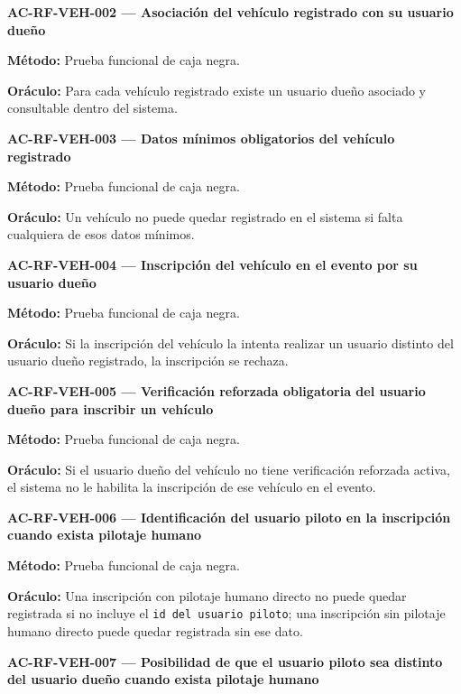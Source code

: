 \documentclass[10pt,letterpaper]{article}
\begin{document}
\noindent\textbf{AC-RF-VEH-002 --- Asociación del vehículo registrado con su usuario dueño}\par
\textbf{Método:} Prueba funcional de caja negra.\par
\textbf{Oráculo:} Para cada vehículo registrado existe un usuario dueño asociado y consultable dentro del sistema.\par\vspace{0.45em}
\noindent\textbf{AC-RF-VEH-003 --- Datos mínimos obligatorios del vehículo registrado}\par
\textbf{Método:} Prueba funcional de caja negra.\par
\textbf{Oráculo:} Un vehículo no puede quedar registrado en el sistema si falta cualquiera de esos datos mínimos.\par\vspace{0.45em}
\noindent\textbf{AC-RF-VEH-004 --- Inscripción del vehículo en el evento por su usuario dueño}\par
\textbf{Método:} Prueba funcional de caja negra.\par
\textbf{Oráculo:} Si la inscripción del vehículo la intenta realizar un usuario distinto del usuario dueño registrado, la inscripción se rechaza.\par\vspace{0.45em}
\noindent\textbf{AC-RF-VEH-005 --- Verificación reforzada obligatoria del usuario dueño para inscribir un vehículo}\par
\textbf{Método:} Prueba funcional de caja negra.\par
\textbf{Oráculo:} Si el usuario dueño del vehículo no tiene verificación reforzada activa, el sistema no le habilita la inscripción de ese vehículo en el evento.\par\vspace{0.45em}
\noindent\textbf{AC-RF-VEH-006 --- Identificación del usuario piloto en la inscripción cuando exista pilotaje humano}\par
\textbf{Método:} Prueba funcional de caja negra.\par
\textbf{Oráculo:} Una inscripción con pilotaje humano directo no puede quedar registrada si no incluye el \texttt{id del usuario piloto}; una inscripción sin pilotaje humano directo puede quedar registrada sin ese dato.\par\vspace{0.45em}
\noindent\textbf{AC-RF-VEH-007 --- Posibilidad de que el usuario piloto sea distinto del usuario dueño cuando exista pilotaje humano}\par
\end{document}
